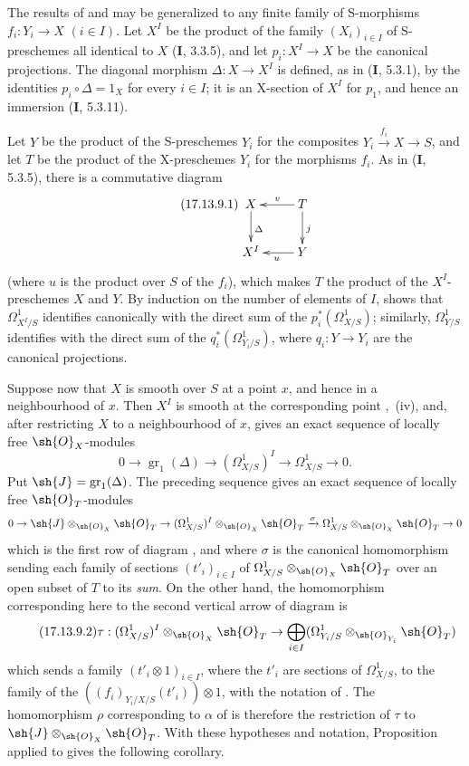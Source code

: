 \begin{env}[17.13.9]
\label{IV.17.13.9}
The results of  and  may be generalized to any finite family of S-morphisms
$f_i:Y_i\to X$ $(i\in I)$.
Let $X^I$ be the product of the family $(X_i)_{i\in I}$ of S-preschemes all identical to $X$ (\textbf{I}, 3.3.5), and let $p_i:X^I\to X$ be the canonical projections.
The diagonal morphism $\Delta:X\to X^I$ is defined, as in (\textbf{I}, 5.3.1), by the identities $p_i\circ\Delta=1_X$ for every $i\in I$; it is an X-section of $X^I$ for $p_1$, and hence an immersion (\textbf{I}, 5.3.11).


Let $Y$ be the product of the S-preschemes $Y_i$ for the composites $Y_i\xrightarrow{f_i}X\to S$, and let $T$ be the product of the X-preschemes $Y_i$ for the morphisms $f_i$.
As in (\textbf{I}, 5.3.5), there is a commutative diagram
\[
\label{IV.17.13.9.1}
\tag{17.13.9.1}
\xymatrix{
  X \ar[d]^{\Delta} & T \ar[l]_-v \ar[d]^{j} \\
  X^I & Y \ar[l]^{u}
}
\]
(where $u$ is the product over $S$ of the $f_i$), which makes $T$ the product of the $X^I$-preschemes $X$ and $Y$.
By induction on the number of elements of $I$,  shows that $\Omega^1_{X^I/S}$ identifies canonically with the direct sum of the $p_i^*(\Omega^1_{X/S})$; similarly, $\Omega^1_{Y/S}$ identifies with the direct sum of the $q_i^*(\Omega^1_{Y_i/S})$, where $q_i:Y\to Y_i$ are the canonical projections.

Suppose now that $X$ is smooth over $S$ at a point $x$, and hence in a neighbourhood of $x$.
Then $X^I$ is smooth at the corresponding point ,~(iv), and, after restricting $X$ to a neighbourhood of $x$,  gives an exact sequence of locally free $\sh{O}_X$-modules
\[
  0\to\operatorname{gr}_1(\Delta)\to(\Omega^1_{X/S})^I\to\Omega^1_{X/S}\to0.
\]
Put $\sh{J}=\operatorname{gr}_1(\Delta)$.
The preceding sequence gives an exact sequence of locally free $\sh{O}_T$-modules
\[
  0 \to \sh{J}\otimes_{\sh{O}_X}\sh{O}_T \to (\Omega^1_{X/S})^I\otimes_{\sh{O}_X}\sh{O}_T \xrightarrow{\sigma} \Omega^1_{X/S}\otimes_{\sh{O}_X}\sh{O}_T \to 0
\]
which is the first row of diagram , and where $\sigma$ is the canonical homomorphism sending each family of sections $(t'_i)_{i\in I}$ of $\Omega^1_{X/S}\otimes_{\sh{O}_X}\sh{O}_T$ over an open subset of $T$ to its \emph{sum}.
On the other hand, the homomorphism corresponding here to the second vertical arrow of diagram  is
\[
\label{IV.17.13.9.2}
\tag{17.13.9.2}
\tau: (\Omega^1_{X/S})^I\otimes_{\sh{O}_X}\sh{O}_T \to \bigoplus_{i\in I}(\Omega^1_{Y_i/S}\otimes_{\sh{O}_{Y_i}}\sh{O}_T)
\]
which sends a family $(t'_i\otimes1)_{i\in I}$, where the $t'_i$ are sections of $\Omega^1_{X/S}$, to the family of the
$((f_i)_{Y_i/X/S}(t'_i))\otimes1$, with the notation of .
The homomorphism $\rho$ corresponding to $\alpha$ of  is therefore the restriction of $\tau$ to $\sh{J}\otimes_{\sh{O}_X}\sh{O}_T$.
With these hypotheses and notation, Proposition  applied to  gives the following corollary.
\end{env}

